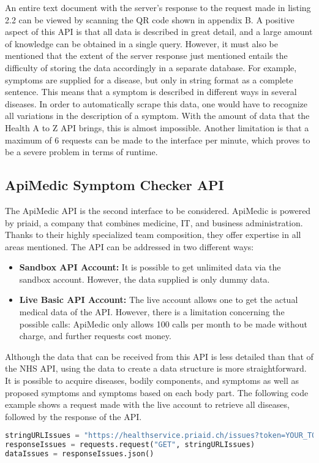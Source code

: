 An entire text document with the server's response to the request made in listing 2.2 can be viewed by scanning the QR code shown in appendix B. A positive aspect of this API is that all data is described in great detail, and a large amount of knowledge can be obtained in a single query. However, it must also be mentioned that the extent of the server response just mentioned entails the difficulty of storing the data accordingly in a separate database. For example, symptoms are supplied for a disease, but only in string format as a complete sentence. This means that a symptom is described in different ways in several diseases. In order to automatically scrape this data, one would have to recognize all variations in the description of a symptom. With the amount of data that the Health A to Z API brings, this is almost impossible. Another limitation is that a maximum of 6 requests can be made to the interface per minute, which proves to be a severe problem in terms of runtime.

\subsection{ApiMedic Symptom Checker API}
The ApiMedic API is the second interface to be considered. ApiMedic is powered by priaid, a company that combines medicine, IT, and business administration. Thanks to their highly specialized team composition, they offer expertise in all areas mentioned. The API can be addressed in two different ways:
\begin{itemize}
	\item \textbf{Sandbox API Account:}
	It is possible to get unlimited data via the sandbox account. However, the data supplied is only dummy data.
	\item \textbf{Live Basic API Account:}
	The live account allows one to get the actual medical data of the API. However, there is a limitation concerning the possible calls: ApiMedic only allows 100 calls per month to be made without charge, and further requests cost money.
\end{itemize}
Although the data that can be received from this API is less detailed than that of the NHS API, using the data to create a data structure is more straightforward. It is possible to acquire diseases, bodily components, and symptoms as well as proposed symptoms and symptoms based on each body part. The following code example shows a request made with the live account to retrieve all diseases, followed by the response of the API.
\begin{lstlisting}[language=Python, caption={Example Python Request for the ApiMedic API (all issues)}]
stringURLIssues = "https://healthservice.priaid.ch/issues?token=YOUR_TOKEN"
responseIssues = requests.request("GET", stringURLIssues)
dataIssues = responseIssues.json()
\end{lstlisting}

